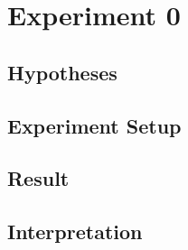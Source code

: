 \documentclass[./\jobname.tex]{subfiles}
\begin{document}
\chapter {Experiment 0}
\label{chap:experimet_0}

\section{Hypotheses}

\section{Experiment Setup}

\section{Result}

\section{Interpretation}
\end{document}
